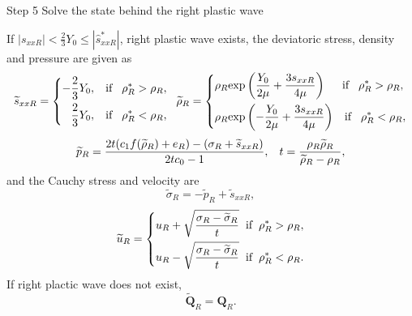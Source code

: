 \documentclass{article}
\numberwithin{equation}{section}
\numberwithin{table}{section}
\begin{document}
Step 5 Solve the state behind the right plastic wave

\vspace{0.3cm} \hspace{0.4cm}  If $|s_{xxR}| < \frac{2}{3}Y_0 \le |\hat{s}_{xxR}^*| $, right plastic wave exists, the deviatoric stress, density and pressure  are given as
\begin{equation*}
  \widetilde{s}_{xxR} =\left\{ \begin{aligned}
	  -\frac{2}{3}Y_0, \hspace{0.3cm} \text{if} \hspace{0.3cm} \rho_R^* > \rho_R,\\
	  \frac{2}{3}Y_0, \hspace{0.3cm} \text{if} \hspace{0.3cm} \rho_R^* < \rho_R,\\
	\end{aligned}\right.
	\hspace{0.2cm} \widetilde{\rho}_{R} = \left\{ \begin{aligned}
	  & \rho_R \text{exp}\left(\frac{Y_0}{2\mu}+\frac{3 s_{xxR}}{4\mu}\right)  \hspace{0.5cm} \text{if} \hspace{0.3cm} \rho_R^* > \rho_R,\\
& \rho_R \text{exp}\left(-\frac{Y_0}{2\mu}+\frac{3 s_{xxR}}{4\mu}\right)
\hspace{0.3cm} \text{if} \hspace{0.3cm} \rho_R^* < \rho_R,\\
  \end{aligned}\right.
 \end{equation*}
\begin{equation*}
  \widetilde{p}_R= \frac{2t(c_1f(\widetilde{\rho}_R)+e_R)-(\sigma_R+\widetilde{s}_{xxR})}{2tc_0-1}, \hspace{0.3cm}
t=\frac{\rho_R \widetilde{\rho}_R}{\widetilde{\rho}_R-\rho_R},
\end{equation*}
and the Cauchy stress and velocity are
\begin{equation*}
\widetilde{\sigma}_R = -\widetilde{p}_R+\widetilde{s}_{xxR},
\end{equation*}
\begin{equation*}
  \widetilde{u}_R= \left\{
  \begin{aligned}
	u_R+\sqrt{\frac{\sigma_R-\widetilde{\sigma}_R}{t}} \hspace{0.2cm} \text{if} \hspace{0.2cm} \rho_R^* >\rho_R,\\
	u_R-\sqrt{\frac{\sigma_R-\widetilde{\sigma}_R}{t}} \hspace{0.2cm} \text{if} \hspace{0.2cm} \rho_R^* <\rho_R.\\
\end{aligned} \right.
\end{equation*}
If right  plactic wave does not exist,
\begin{equation*}
  \widetilde{\bm{Q}}_R = \bm{Q}_R.
\end{equation*}
\end{document}

